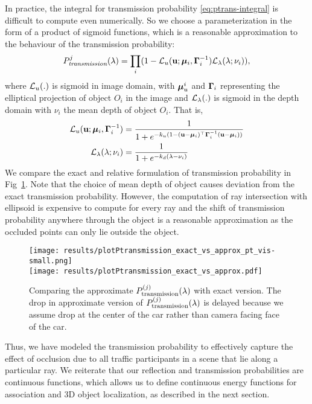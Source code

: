 In practice, the integral for transmission probability \eqref{eq:ptrans-integral} is difficult to compute even numerically. So we choose a parameterization in the form of a product of sigmoid functions, which is a reasonable approximation to the behaviour of the transmission probability:
%
\newcommand{\Ptransmission}{P_{\textit{transmission}}}%
\begin{align}
  \Ptransmission^j(\lambda) = \prod_i (1 - \cL_u (\bu; \bmu_i, \bGamma_i^{-1}) \cL_{\lambda}(\lambda; \nu_i)),
\label{eq:evalCumulativePtrans}
\end{align}
%
where $\mathcal{L}_u(.)$ is sigmoid in image domain, with ${\bm{\mu}}^i_u$ and $\bm{\Gamma}_i$ representing the elliptical projection of object $O_i$ in the image and $\mathcal{L}_{\lambda}(.)$ is sigmoid in the depth domain with $\nu_i$ the mean depth of object $O_i$. That is,
%
\begin{align}
\mathcal{L}_u(\mathbf{u}; {\bm{\mu}}_i, \bm{\Gamma}_i^{-1}) &= \frac{1}{1 + e^{-k_u(1 - (\mathbf{u} - {\bm{\mu}}_i)^\top \bm{\Gamma}_i^{-1} (\mathbf{u} - {\bm{\mu}}_i))}} \\
\mathcal{L}_{\lambda}(\lambda; \nu_i) &= \frac{1}{1 + e^{-k_d(\lambda - \nu_i)}}
\end{align}
%
We compare the exact and relative formulation of transmission probability in
Fig~\ref{fig:compare:exact:approx:ptrans}. Note that the choice of mean depth
of object causes deviation from the exact transmission probability. However,
the computation of ray intersection with ellipsoid is expensive to compute for 
every ray and the shift of transmission probability anywhere through the object 
is a reasonable approximation as the occluded points can only lie outside the
object.

\begin{figure}
  \texttt{[image: results/plotPtransmission\_exact\_vs\_approx\_pt\_vis-small.png]}\\
  \texttt{[image: results/plotPtransmission\_exact\_vs\_approx.pdf]}
  \caption{Comparing the approximate $P^{(j)}_{\text{transmission}}(\lambda)$ with exact version. The drop in approximate version of $P^{(j)}_{\text{transmission}}(\lambda)$ is delayed because we assume drop at the center of the car rather than camera facing face of the car.}
  \label{fig:compare:exact:approx:ptrans}
\end{figure}

Thus, we have modeled the transmission probability to effectively capture the effect of occlusion due to all traffic participants in a scene that lie along a particular ray. We reiterate that our reflection and transmission probabilities are continuous functions, which allows us to define continuous energy functions for association and 3D object localization, as described in the next section.

